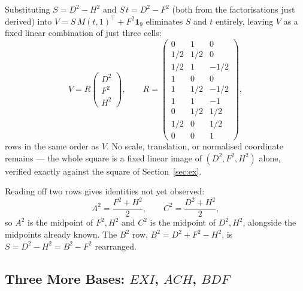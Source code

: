 \documentclass[12pt]{article}
\theoremstyle{remark}
\begin{document}
Substituting $S = D^2 - H^2$ and $S\,t = D^2 - F^2$ (both from the
factorisations just derived) into $V = S\,M(t,1)^\top + F^2\mathbf{1}_9$
eliminates $S$ and $t$ entirely, leaving $V$ as a fixed linear
combination of just three cells:
\[
V = R \begin{pmatrix} D^2 \\ F^2 \\ H^2 \end{pmatrix} , \qquad
R =
\begin{pmatrix}
0 & 1 & 0 \\
1/2 & 1/2 & 0 \\
1/2 & 1 & -1/2 \\
1 & 0 & 0 \\
1 & 1/2 & -1/2 \\
1 & 1 & -1 \\
0 & 1/2 & 1/2 \\
1/2 & 0 & 1/2 \\
0 & 0 & 1
\end{pmatrix} ,
\]
rows in the same order as $V$. No scale, translation, or normalised
coordinate remains --- the whole square is a fixed linear image of
$(D^2, F^2, H^2)$ alone, verified exactly against the square of
Section~\ref{sec:ex}.

Reading off two rows gives identities not yet observed:
\[
A^2 = \frac{F^2+H^2}{2} , \qquad C^2 = \frac{D^2+H^2}{2} ,
\]
so $A^2$ is the midpoint of $F^2, H^2$ and $C^2$ is the midpoint of
$D^2, H^2$, alongside the midpoints already known. The $B^2$ row,
$B^2 = D^2+F^2-H^2$, is $S = D^2-H^2 = B^2-F^2$ rearranged.

\subsection{Three More Bases: $EXI$, $ACH$, $BDF$}
\end{document}
